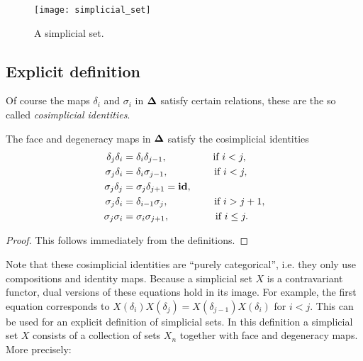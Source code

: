\begin{figure}
	\texttt{[image: simplicial\_set]}
	\caption{A simplicial set.}
	\label{fig:simplicial_set}
\end{figure}


\subsection{Explicit definition}
Of course the maps $\delta_i$ and $\sigma_i$ in $\mathbf{\Delta}$ satisfy certain relations, these are the so called \emph{cosimplicial identities}.

\begin{lemma}
	The face and degeneracy maps in $\mathbf{\Delta}$ satisfy the cosimplicial identities
	\begin{align}
		\delta_j\delta_i &= \delta_i\delta_{j-1},  \hspace{1.5cm} \textnormal{ if } i < j,\\
		\sigma_j\delta_i &= \delta_i\sigma_{j-1},  \hspace{1.5cm} \textnormal{ if } i < j,\\
		\sigma_j\delta_j &= \sigma_j\delta_{j+1} = \mathbf{id},\\
		\sigma_j\delta_i &= \delta_{i-1}\sigma_j,  \hspace{1.5cm} \textnormal{ if } i > j+1,\\
		\sigma_j\sigma_i &= \sigma_i\sigma_{j+1},  \hspace{1.5cm} \textnormal{ if } i \leq j.
	\end{align}
\end{lemma}
\begin{proof}
	This follows immediately from the definitions.
\end{proof}

Note that these cosimplicial identities are ``purely categorical'', i.e. they only use compositions and identity maps. Because a simplicial set $X$ is a contravariant functor, dual versions of these equations hold in its image. For example, the first equation corresponds to $X(\delta_i)X(\delta_j) = X(\delta_{j-1})X(\delta_i)$ for $i < j$. This can be used for an explicit definition of simplicial sets. In this definition a simplicial set $X$ consists of a collection of sets $X_n$ together with face and degeneracy maps. More precisely:


